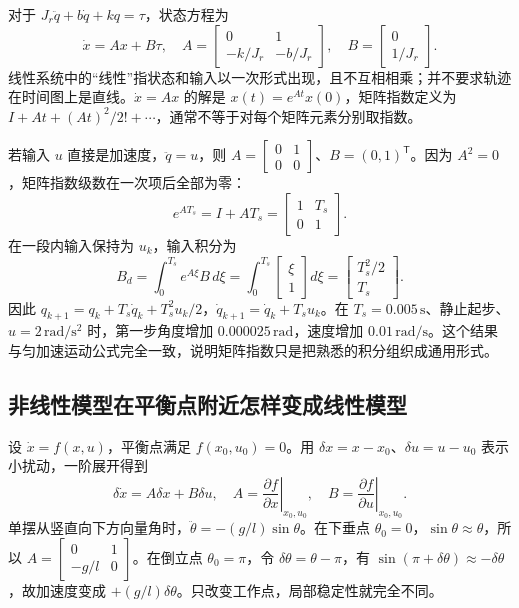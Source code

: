 对于 $J_r\ddot q+b\dot q+kq=\tau$，状态方程为
\begin{equation}
 \dot x=Ax+B\tau,\quad
 A=\begin{bmatrix}0&1\\-k/J_r&-b/J_r\end{bmatrix},\quad
 B=\begin{bmatrix}0\\1/J_r\end{bmatrix}.
\end{equation}
线性系统中的“线性”指状态和输入以一次形式出现，且不互相相乘；并不要求轨迹在时间图上是直线。$\dot x=Ax$ 的解是 $x(t)=e^{At}x(0)$，矩阵指数定义为 $I+At+(At)^2/2!+\cdots$，通常不等于对每个矩阵元素分别取指数。


\begin{examplebox}[算例 用矩阵指数精确推进一个双积分模型]
若输入 $u$ 直接是加速度，$\ddot q=u$，则 $A=\begin{bmatrix}0&1\\0&0\end{bmatrix}$、$B=(0,1)^\mathsf T$。因为 $A^2=0$，矩阵指数级数在一次项后全部为零：
\[
 e^{AT_s}=I+AT_s=\begin{bmatrix}1&T_s\\0&1\end{bmatrix}.
\]
在一段内输入保持为 $u_k$，输入积分为
\[
 B_d=\int_0^{T_s}e^{A\xi}B\,d\xi
 =\int_0^{T_s}\begin{bmatrix}\xi\\1\end{bmatrix}d\xi
 =\begin{bmatrix}T_s^2/2\\T_s\end{bmatrix}.
\]
因此 $q_{k+1}=q_k+T_s\dot q_k+T_s^2u_k/2$，$\dot q_{k+1}=\dot q_k+T_su_k$。在 $T_s=0.005\,\mathrm s$、静止起步、$u=2\,\mathrm{rad/s^2}$ 时，第一步角度增加 $0.000025\,\mathrm{rad}$，速度增加 $0.01\,\mathrm{rad/s}$。这个结果与匀加速运动公式完全一致，说明矩阵指数只是把熟悉的积分组织成通用形式。
\end{examplebox}

\subsection{非线性模型在平衡点附近怎样变成线性模型}
设 $\dot x=f(x,u)$，平衡点满足 $f(x_0,u_0)=0$。用 $\delta x=x-x_0$、$\delta u=u-u_0$ 表示小扰动，一阶展开得到
\begin{equation}
 \delta\dot x=A\delta x+B\delta u,
 \quad A=\left.\frac{\partial f}{\partial x}\right|_{x_0,u_0},
 \quad B=\left.\frac{\partial f}{\partial u}\right|_{x_0,u_0}.
\end{equation}
单摆从竖直向下方向量角时，$\ddot\theta=-(g/l)\sin\theta$。在下垂点 $\theta_0=0$，$\sin\theta\approx\theta$，所以 $A=\begin{bmatrix}0&1\\-g/l&0\end{bmatrix}$。在倒立点 $\theta_0=\pi$，令 $\delta\theta=\theta-\pi$，有 $\sin(\pi+\delta\theta)\approx-\delta\theta$，故加速度变成 $+(g/l)\delta\theta$。只改变工作点，局部稳定性就完全不同。

